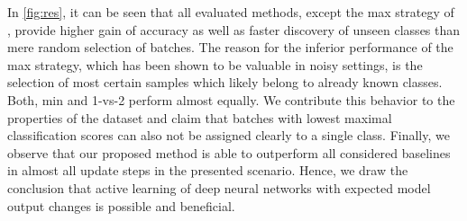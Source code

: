 \documentclass{article}
\begin{document}
In \cref{fig:res}, it can be seen that all evaluated methods, except the max strategy of \cite{krause2015unreasonable},
provide higher gain of accuracy as well as faster discovery of unseen classes than mere random selection of batches.
The reason for the inferior performance of the max strategy, which has been shown to be valuable in noisy settings, is the selection of most certain samples which likely belong to already known classes.
Both, min \cite{novotny16i-have} and 1-vs-2 \cite{wang2016cost} perform almost equally.
We contribute this behavior to the properties of the dataset and claim that batches with lowest maximal classification scores can also not be assigned clearly to a single class.
Finally, we observe that our proposed method is able to outperform all considered baselines in almost all update steps in the presented scenario.
Hence, we draw the conclusion that active learning of deep neural networks with expected model output changes is possible and beneficial.
%
%
%
\newlength{\updatesizewidth}%
\newlength{\updatesizeheight}%
\setlength{\updatesizewidth}{.35\textwidth}%
\setlength{\updatesizeheight}{.13\textheight}%
%
%
\newlength{\XLabelDistupdatesize}%
\newlength{\YLabelDistupdatesize}%
\setlength{\XLabelDistupdatesize}{-3pt}%
\setlength{\YLabelDistupdatesize}{-3pt}%
%
%
\newlength{\updatesizeColSepLegend}
\setlength{\updatesizeColSepLegend}{6pt}%
%
\newlength{\lwupdatesize}
\newlength{\lwupdatesizeplot}
\setlength{\lwupdatesize}{1.0pt}%
\setlength{\lwupdatesizeplot}{2.5pt}%
%
\newlength{\mytikzplotColSepLegend}
\setlength{\mytikzplotColSepLegend}{8pt}
%
\end{document}
